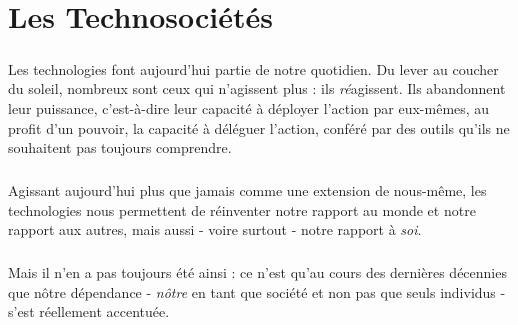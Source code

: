 \chapter{Les Technosociétés}

\paragraph{} Les technologies font aujourd'hui partie de notre quotidien. Du lever au coucher du soleil, nombreux sont
ceux qui n'agissent plus : ils \emph{ré}agissent. Ils abandonnent leur puissance, c'est-à-dire leur capacité à déployer
l'action par eux-mêmes, au profit d'un pouvoir, la capacité à déléguer l'action, conféré par des outils qu'ils ne 
souhaitent pas toujours comprendre.

\paragraph{} Agissant aujourd'hui plus que jamais comme une extension de nous-même, les technologies nous permettent de
réinventer notre rapport au monde et notre rapport aux autres, mais aussi - voire surtout - notre rapport à \emph{soi}.
\cite{Damasio2}

\paragraph{} Mais il n'en a pas toujours été ainsi : ce n'est qu'au cours des dernières décennies que nôtre dépendance
- \emph{nôtre} en tant que société et non pas que seuls individus - s'est réellement accentuée.



 
